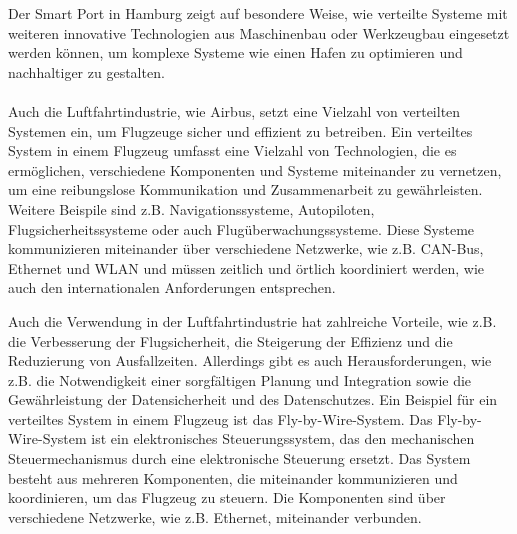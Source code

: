 \documentclass[../vs-script-first-v01.tex]{subfiles}
\begin{document}
Der Smart Port in Hamburg zeigt auf besondere Weise, wie verteilte Systeme mit weiteren innovative Technologien aus Maschinenbau oder Werkzeugbau  eingesetzt werden können\cite{Bockenfeld2020}, um komplexe Systeme wie einen Hafen zu optimieren und nachhaltiger zu gestalten.
\\\\
Auch die Luftfahrtindustrie, wie Airbus, setzt eine Vielzahl von verteilten Systemen ein, um Flugzeuge sicher und effizient zu betreiben. Ein verteiltes System in einem Flugzeug umfasst eine Vielzahl von Technologien, die es ermöglichen, verschiedene Komponenten und Systeme miteinander zu vernetzen, um eine reibungslose Kommunikation und Zusammenarbeit zu gewährleisten\cite{chen2017distributed}. Weitere Beispile sind z.B. Navigationssysteme, Autopiloten, Flugsicherheitssysteme oder auch Flugüberwachungssysteme. Diese Systeme kommunizieren miteinander über verschiedene Netzwerke, wie z.B. CAN-Bus, Ethernet und WLAN und müssen zeitlich und örtlich koordiniert werden, wie auch den internationalen Anforderungen entsprechen.

Auch die Verwendung in der Luftfahrtindustrie hat zahlreiche Vorteile, wie z.B. die Verbesserung der Flugsicherheit, die Steigerung der Effizienz und die Reduzierung von Ausfallzeiten. Allerdings gibt es auch Herausforderungen, wie z.B. die Notwendigkeit einer sorgfältigen Planung und Integration sowie die Gewährleistung der Datensicherheit und des Datenschutzes. Ein Beispiel für ein verteiltes System in einem Flugzeug ist das Fly-by-Wire-System. Das Fly-by-Wire-System ist ein elektronisches Steuerungssystem, das den mechanischen Steuermechanismus durch eine elektronische Steuerung ersetzt\cite{tian2017fault}. Das System besteht aus mehreren Komponenten, die miteinander kommunizieren und koordinieren, um das Flugzeug zu steuern. Die Komponenten sind über verschiedene Netzwerke, wie z.B. Ethernet\cite{wang2018architecture}, miteinander verbunden.
\end{document}
